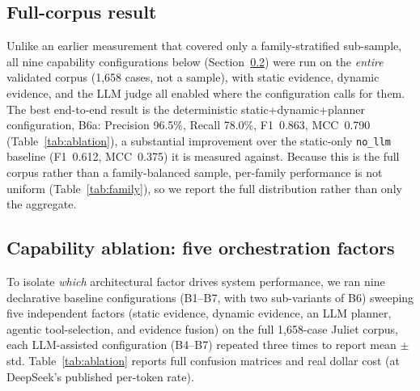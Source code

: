 \documentclass[11pt,a4paper]{article}
\begin{document}
\subsection{Full-corpus result}
\label{sec:eval-fullcorpus}

Unlike an earlier measurement that covered only a family-stratified
sub-sample, all nine capability configurations below (Section~\ref{sec:eval-ablation})
were run on the \emph{entire} validated corpus (1{,}658 cases, not a
sample), with static evidence, dynamic evidence, and the LLM judge all
enabled where the configuration calls for them. The best end-to-end result
is the deterministic static+dynamic+planner configuration, B6a: Precision
96.5\%, Recall 78.0\%, F1~0.863, MCC~0.790 (Table~\ref{tab:ablation}), a
substantial improvement over the static-only \texttt{no\_llm} baseline
(F1~0.612, MCC~0.375) it is measured against. Because this is the full
corpus rather than a family-balanced sample, per-family performance is not
uniform (Table~\ref{tab:family}), so we report the full distribution rather
than only the aggregate.

\subsection{Capability ablation: five orchestration factors}
\label{sec:eval-ablation}

To isolate \emph{which} architectural factor drives system performance,
we ran nine declarative baseline configurations (B1--B7, with two
sub-variants of B6) sweeping five independent factors (static evidence,
dynamic evidence, an LLM planner, agentic tool-selection, and evidence
fusion) on the full 1{,}658-case Juliet corpus, each LLM-assisted
configuration (B4--B7) repeated three times to report mean $\pm$ std.
Table~\ref{tab:ablation} reports full confusion matrices and real dollar
cost (at DeepSeek's published per-token rate).
\end{document}
